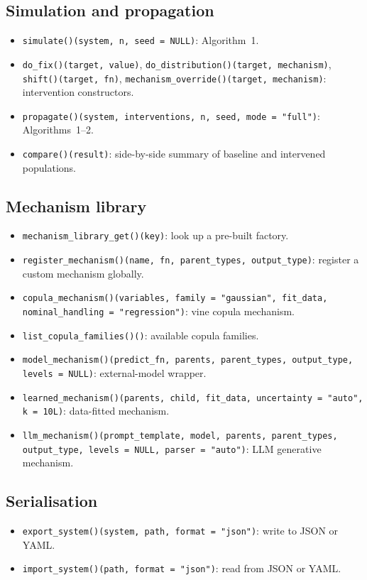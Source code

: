 \documentclass[12pt,a4paper]{article}
\newcommand{\code}[1]{\texttt{#1}}
\newcommand{\fct}[1]{\mbox{\texttt{#1()}}}
\begin{document}
\subsection{Simulation and propagation}
\begin{itemize}[leftmargin=2em]
  \item \fct{simulate}\code{(system, n, seed = NULL)}: Algorithm~1.
  \item \fct{do\_fix}\code{(target, value)},
        \fct{do\_distribution}\code{(target, mechanism)},
        \fct{shift}\code{(target, fn)},
        \fct{mechanism\_override}\code{(target, mechanism)}: intervention
        constructors.
  \item \fct{propagate}\code{(system, interventions, n, seed, mode = "full")}:
        Algorithms~1--2.
  \item \fct{compare}\code{(result)}: side-by-side summary of baseline and
        intervened populations.
\end{itemize}

\subsection{Mechanism library}
\begin{itemize}[leftmargin=2em]
  \item \fct{mechanism\_library\_get}\code{(key)}: look up a pre-built factory.
  \item \fct{register\_mechanism}\code{(name, fn, parent\_types, output\_type)}:
        register a custom mechanism globally.
  \item \fct{copula\_mechanism}\code{(variables, family = "gaussian", fit\_data,
        nominal\_handling = "regression")}: vine copula mechanism.
  \item \fct{list\_copula\_families}\code{()}: available copula families.
  \item \fct{model\_mechanism}\code{(predict\_fn, parents, parent\_types,
        output\_type, levels = NULL)}: external-model wrapper.
  \item \fct{learned\_mechanism}\code{(parents, child, fit\_data,
        uncertainty = "auto", k = 10L)}: data-fitted mechanism.
  \item \fct{llm\_mechanism}\code{(prompt\_template, model, parents,
        parent\_types, output\_type, levels = NULL, parser = "auto")}: LLM
        generative mechanism.
\end{itemize}

\subsection{Serialisation}
\begin{itemize}[leftmargin=2em]
  \item \fct{export\_system}\code{(system, path, format = "json")}: write to
        JSON or YAML.
  \item \fct{import\_system}\code{(path, format = "json")}: read from JSON or
        YAML.
\end{itemize}
\end{document}
